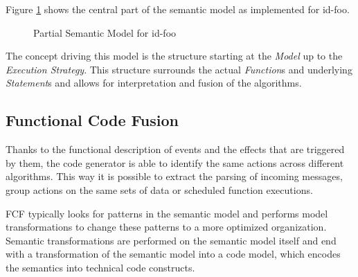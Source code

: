 \documentclass[conference]{IEEEtran}
\newcommand{\NAME}{id-foo\xspace}
\begin{document}
Figure \ref{fig:meta-model} shows the central part of the semantic model as
implemented for \NAME.

\begin{figure}[ht]
  \centering
\caption{Partial Semantic Model for \NAME}
\label{fig:meta-model}
\end{figure}

The concept driving this model is the structure starting at the \emph{Model} up
to the \emph{Execution Strategy}. This structure surrounds the actual
\emph{Function}s and underlying \emph{Statement}s and allows for interpretation
and fusion of the algorithms.

\subsection{Functional Code Fusion}

Thanks to the functional description of events and the effects that are
triggered by them, the code generator is able to identify the same actions
across different algorithms. This way it is possible to extract the parsing of
incoming messages, group actions on the same sets of data or scheduled function
executions.

FCF typically looks for patterns in the semantic model and performs model
transformations to change these patterns to a more optimized organization.
Semantic transformations are performed on the semantic model itself and end
with a transformation of the semantic model into a code model, which encodes
the semantics into technical code constructs.
\end{document}
